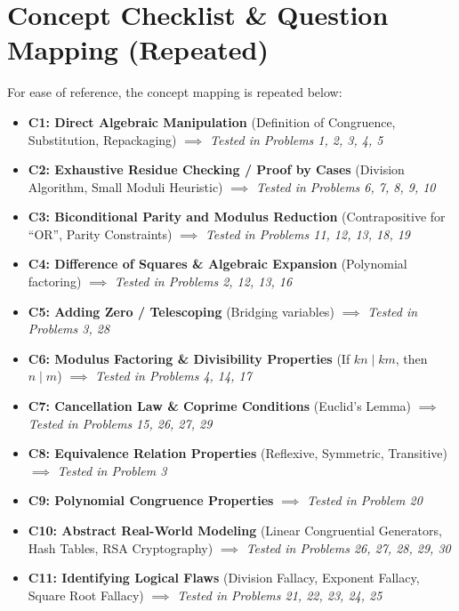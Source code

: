 \documentclass{article}
\begin{document}
\newpage

\section*{Concept Checklist \& Question Mapping (Repeated)}
For ease of reference, the concept mapping is repeated below:

\begin{itemize}
    \item \textbf{C1: Direct Algebraic Manipulation} (Definition of Congruence, Substitution, Repackaging) $\implies$ \textit{Tested in Problems 1, 2, 3, 4, 5}
    \item \textbf{C2: Exhaustive Residue Checking / Proof by Cases} (Division Algorithm, Small Moduli Heuristic) $\implies$ \textit{Tested in Problems 6, 7, 8, 9, 10}
    \item \textbf{C3: Biconditional Parity and Modulus Reduction} (Contrapositive for ``OR'', Parity Constraints) $\implies$ \textit{Tested in Problems 11, 12, 13, 18, 19}
    \item \textbf{C4: Difference of Squares \& Algebraic Expansion} (Polynomial factoring) $\implies$ \textit{Tested in Problems 2, 12, 13, 16}
    \item \textbf{C5: Adding Zero / Telescoping} (Bridging variables) $\implies$ \textit{Tested in Problems 3, 28}
    \item \textbf{C6: Modulus Factoring \& Divisibility Properties} (If $kn \mid km$, then $n \mid m$) $\implies$ \textit{Tested in Problems 4, 14, 17}
    \item \textbf{C7: Cancellation Law \& Coprime Conditions} (Euclid's Lemma) $\implies$ \textit{Tested in Problems 15, 26, 27, 29}
    \item \textbf{C8: Equivalence Relation Properties} (Reflexive, Symmetric, Transitive) $\implies$ \textit{Tested in Problem 3}
    \item \textbf{C9: Polynomial Congruence Properties} $\implies$ \textit{Tested in Problem 20}
    \item \textbf{C10: Abstract Real-World Modeling} (Linear Congruential Generators, Hash Tables, RSA Cryptography) $\implies$ \textit{Tested in Problems 26, 27, 28, 29, 30}
    \item \textbf{C11: Identifying Logical Flaws} (Division Fallacy, Exponent Fallacy, Square Root Fallacy) $\implies$ \textit{Tested in Problems 21, 22, 23, 24, 25}
\end{itemize}
\end{document}
